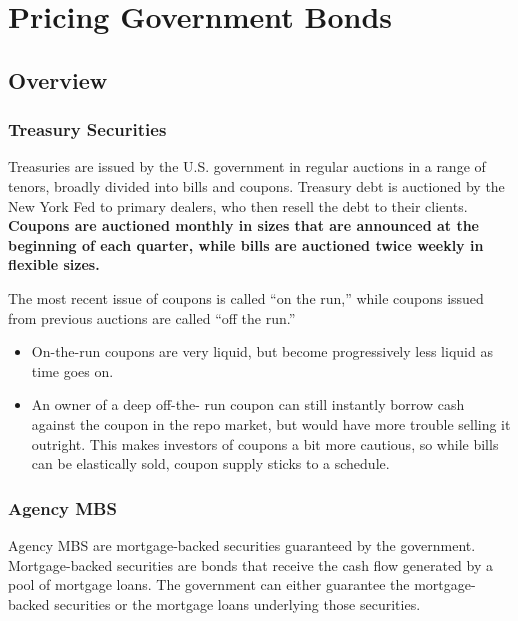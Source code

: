 \documentclass[
]{book}
\providecommand{\tightlist}{%
  \setlength{\itemsep}{0pt}\setlength{\parskip}{0pt}}
\begin{document}
\hypertarget{pricing-government-bonds}{%
\chapter{Pricing Government Bonds}\label{pricing-government-bonds}}

\hypertarget{overview-1}{%
\section{Overview}\label{overview-1}}

\hypertarget{treasury-securities}{%
\subsection{Treasury Securities}\label{treasury-securities}}

Treasuries are issued by the U.S. government in regular auctions in a range of tenors, broadly divided into bills and coupons. Treasury debt is auctioned by the New York Fed to primary dealers, who then resell the debt to their clients. \textbf{Coupons are auctioned monthly in sizes that are announced at the beginning of each quarter, while bills are auctioned twice weekly in flexible sizes.}

The most recent issue of coupons is called ``on the run,'' while coupons issued from previous auctions are called ``off the run.''

\begin{itemize}
\tightlist
\item
  On-the-run coupons are very liquid, but become progressively less liquid as time goes on.
\item
  An owner of a deep off-the- run coupon can still instantly borrow cash against the coupon in the repo market, but would have more trouble selling it outright. This makes investors of coupons a bit more cautious, so while bills can be elastically sold, coupon supply sticks to a schedule.
\end{itemize}

\hypertarget{agency-mbs}{%
\subsection{Agency MBS}\label{agency-mbs}}

Agency MBS are mortgage-backed securities guaranteed by the government. Mortgage-backed securities are bonds that receive the cash flow generated by a pool of mortgage loans. The government can either guarantee the mortgage-backed securities or the mortgage loans underlying those securities.
\end{document}
